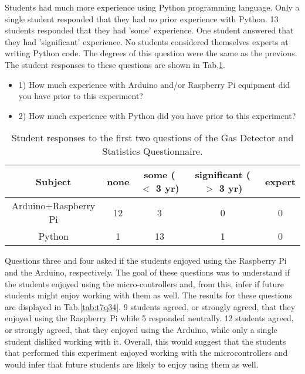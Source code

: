 Students had much more experience using Python programming language.
Only a single student responded that they had no prior experience with Python.
13 students responded that they had 'some' experience.
One student answered that they had 'significant' experience.
No students considered themselves experts at writing Python code.
The degrees of this question were the same as the previous.
The student responses to these questions are shown in Tab.\ref{tab:t7q12}.

\begin{table}[htpb]
  \scriptsize
  \begin{center}
    \caption{\scriptsize Student responses to the first two questions of the Gas Detector and Statistics Questionnaire.}
    \label{tab:t7q12}
    \begin{itemize}
    \item 1) How much experience with Arduino and/or Raspberry Pi equipment did you have prior to this experiment?
    \item 2) How much experience with Python did you have prior to this experiment?
    \end{itemize}
    

    \begin{tabular}{|c | c | c | c | c |}
      \hline
      Subject & none & some ($<$ 3 yr) & significant  ($>$ 3 yr) & expert\\
      \hline
      Arduino+Raspberry Pi & 12 & 3 & 0 & 0\\
      \hline
      Python & 1 & 13 & 1 & 0\\
      \hline
    \end{tabular}
  \end{center}%
\end{table}


Questions three and four asked if the students enjoyed using the Raspberry Pi and the Arduino, respectively.
The goal of these questions was to understand if the students enjoyed using the micro-controllers and, from this, infer if future students might enjoy working with them as well.
The results for these questions are displayed in Tab.\ref{tab:t7q34}.
9 students agreed, or strongly agreed, that they enjoyed using the Raspberry Pi while 5 responded neutrally.
12 students agreed, or strongly agreed, that they enjoyed using the Arduino, while only a single student disliked working with it.
Overall, this would suggest that the students that performed this experiment enjoyed working with the microcontrollers and would infer that future students are likely to enjoy using them as well.


